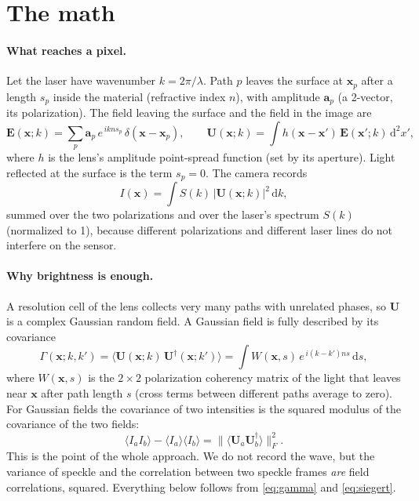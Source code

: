 \documentclass[11pt]{article}
\newcommand{\dd}{\mathrm{d}}
\begin{document}
\section{The math}\label{sec:math}

\paragraph{What reaches a pixel.} Let the laser have wavenumber $k=2\pi/\lambda$. Path $p$ leaves the surface at
$\mathbf{x}_p$ after a length $s_p$ inside the material (refractive index $n$), with amplitude $\mathbf{a}_p$ (a
2-vector, its polarization). The field leaving the surface and the field in the image are
\begin{equation}
\mathbf{E}(\mathbf{x};k)=\sum_p \mathbf{a}_p\,e^{\,i k n s_p}\,\delta(\mathbf{x}-\mathbf{x}_p),\qquad
\mathbf{U}(\mathbf{x};k)=\int h(\mathbf{x}-\mathbf{x}')\,\mathbf{E}(\mathbf{x}';k)\,\dd^2x' ,
\end{equation}
where $h$ is the lens's amplitude point-spread function (set by its aperture). Light reflected at the surface is the
term $s_p=0$. The camera records
\begin{equation}
I(\mathbf{x})=\int S(k)\,\bigl|\mathbf{U}(\mathbf{x};k)\bigr|^2\,\dd k ,
\end{equation}
summed over the two polarizations and over the laser's spectrum $S(k)$ (normalized to 1), because different
polarizations and different laser lines do not interfere on the sensor.

\paragraph{Why brightness is enough.} A resolution cell of the lens collects very many paths with unrelated phases,
so $\mathbf{U}$ is a complex Gaussian random field. A Gaussian field is fully described by its covariance
\begin{equation}
\Gamma(\mathbf{x};k,k')=\bigl\langle \mathbf{U}(\mathbf{x};k)\,\mathbf{U}^\dagger(\mathbf{x};k')\bigr\rangle
=\int W(\mathbf{x},s)\,e^{\,i(k-k')ns}\,\dd s ,
\label{eq:gamma}
\end{equation}
where $W(\mathbf{x},s)$ is the $2\times2$ polarization coherency matrix of the light that leaves near $\mathbf{x}$
after path length $s$ (cross terms between different paths average to zero). For Gaussian fields the covariance of
two intensities is the squared modulus of the covariance of the two fields:
\begin{equation}
\langle I_a I_b\rangle-\langle I_a\rangle\langle I_b\rangle=\bigl\|\langle \mathbf{U}_a\mathbf{U}_b^\dagger\rangle\bigr\|_F^2 .
\label{eq:siegert}
\end{equation}
This is the point of the whole approach. We do not record the wave, but the variance of speckle and the correlation
between two speckle frames \emph{are} field correlations, squared. Everything below follows from
\eqref{eq:gamma} and \eqref{eq:siegert}.
\end{document}
